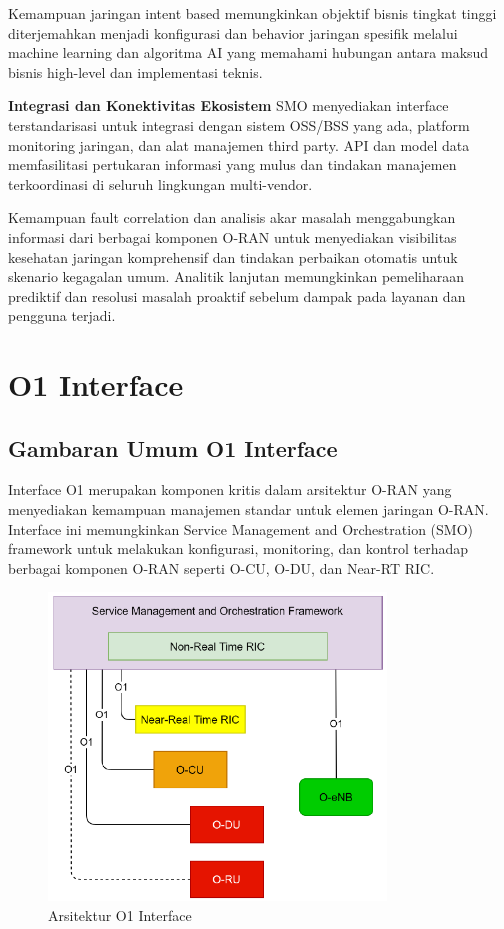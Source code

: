 Kemampuan jaringan intent based memungkinkan objektif bisnis tingkat tinggi diterjemahkan menjadi konfigurasi dan behavior jaringan spesifik melalui machine learning dan algoritma AI yang memahami hubungan antara maksud bisnis high-level dan implementasi teknis.

\textbf{Integrasi dan Konektivitas Ekosistem} SMO menyediakan interface terstandarisasi untuk integrasi dengan sistem OSS/BSS yang ada, platform monitoring jaringan, dan alat manajemen third party. API dan model data memfasilitasi pertukaran informasi yang mulus dan tindakan manajemen terkoordinasi di seluruh lingkungan multi-vendor.

Kemampuan fault correlation dan analisis akar masalah menggabungkan informasi dari berbagai komponen O-RAN untuk menyediakan visibilitas kesehatan jaringan komprehensif dan tindakan perbaikan otomatis untuk skenario kegagalan umum. Analitik lanjutan memungkinkan pemeliharaan prediktif dan resolusi masalah proaktif sebelum dampak pada layanan dan pengguna terjadi.

\section{O1 Interface} 

\subsection{Gambaran Umum O1 Interface}

Interface O1 merupakan komponen kritis dalam arsitektur O-RAN yang menyediakan kemampuan manajemen standar untuk elemen jaringan O-RAN. Interface ini memungkinkan Service Management and Orchestration (SMO) framework untuk melakukan konfigurasi, monitoring, dan kontrol terhadap berbagai komponen O-RAN seperti O-CU, O-DU, dan Near-RT RIC.

\begin{figure}[h]
    \centering
    \includegraphics[width=0.8\textwidth]{assets/pics/bab3_14.png}
    \caption{Arsitektur O1 Interface}
    \label{fig:o1_interface}
\end{figure}


